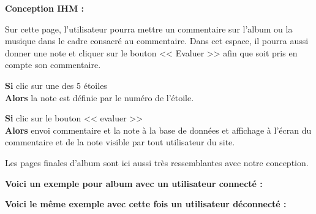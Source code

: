             \begin{paragraphe}
                \textbf{Conception IHM :}
            \end{paragraphe}

			\begin{paragraphe}
				Sur cette page, l'utilisateur pourra mettre un commentaire sur l'album ou la musique dans le cadre consacré au commentaire.
				Dans cet espace, il pourra aussi donner une note et cliquer sur le bouton << Evaluer >> afin que soit pris en compte son commentaire.
			\end{paragraphe}

			\begin{paragraphe}
				\textbf{Si} clic sur une des 5 étoiles \\
				\textbf{Alors} la note est définie par le numéro de l'étoile.
			\end{paragraphe}

			\begin{paragraphe}
				\textbf{Si} clic sur le bouton << evaluer >> \\
				\textbf{Alors} envoi commentaire et la note à la base de données et affichage à l'écran du commentaire et de la note visible par tout utilisateur du site.
			\end{paragraphe}


        \clearpage


        \clearpage
        
			\begin{paragraphe}
                Les pages finales d'album sont ici aussi très ressemblantes avec notre conception.
			\end{paragraphe}

			\begin{paragraphe}
                \textbf{Voici un exemple pour album avec un utilisateur connecté :}
			\end{paragraphe}
            

			\begin{paragraphe}
                \textbf{Voici le même exemple avec cette fois un utilisateur déconnecté :}
			\end{paragraphe}
            
